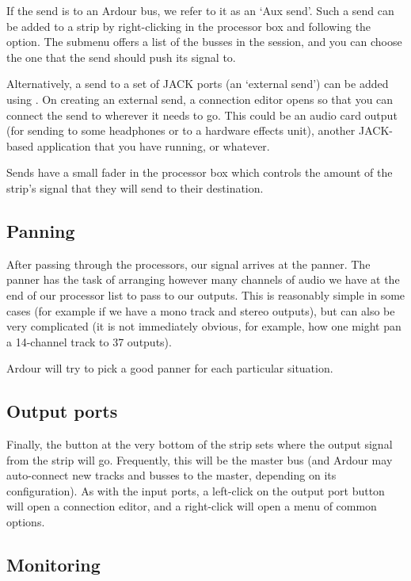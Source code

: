 \documentclass[10pt,a4paper]{book}
\newcommand{\menu}[1]{\emph{\StrSubstitute{#1}{,}{ $\rightarrow$ }}}
\begin{document}
{If the send is to an Ardour bus, we refer to it as an `Aux send'.
Such a send can be added to a strip by right-clicking in the processor
box and following the \menu{New Aux Send} option.  The submenu offers
a list of the busses in the session, and you can choose the one that
the send should push its signal to.

Alternatively, a send to a set of JACK ports (an `external send') can
be added using \menu{New External Send}.  On creating an external
send, a connection editor opens so that you can connect the send to
wherever it needs to go.  This could be an audio card output (for
sending to some headphones or to a hardware effects unit), another
JACK-based application that you have running, or whatever.

Sends have a small fader in the processor box which controls the
amount of the strip's signal that they will send to their destination.


\subsection{Panning}

After passing through the processors, our signal arrives at the
panner.  The panner has the task of arranging however many channels of
audio we have at the end of our processor list to pass to our outputs.
This is reasonably simple in some cases (for example if we have a mono
track and stereo outputs), but can also be very complicated (it is not
immediately obvious, for example, how one might pan a 14-channel track
to 37 outputs).

Ardour will try to pick a good panner for each particular situation.


\subsection{Output ports}

Finally, the button at the very bottom of the strip sets where the
output signal from the strip will go.  Frequently, this will be the
master bus (and Ardour may auto-connect new tracks and busses to the
master, depending on its configuration).  As with the input ports, a
left-click on the output port button will open a connection editor,
and a right-click will open a menu of common options.



\subsection{Monitoring}

}
\end{document}
